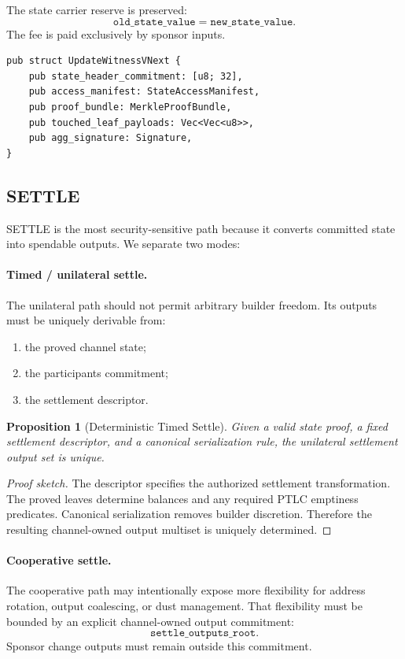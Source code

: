 \documentclass[11pt,a4paper]{article}
\newtheorem{proposition}[theorem]{Proposition}
\begin{document}
The state carrier reserve is preserved:
\[
\texttt{old\_state\_value} = \texttt{new\_state\_value}.
\]
The fee is paid exclusively by sponsor inputs.

\begin{lstlisting}[caption={Proof-First UPDATE Witness Sketch}, float=!htb]
pub struct UpdateWitnessVNext {
    pub state_header_commitment: [u8; 32],
    pub access_manifest: StateAccessManifest,
    pub proof_bundle: MerkleProofBundle,
    pub touched_leaf_payloads: Vec<Vec<u8>>,
    pub agg_signature: Signature,
}
\end{lstlisting}

\subsection{SETTLE}

SETTLE is the most security-sensitive path because it converts committed state into spendable outputs. We separate two modes:

\paragraph{Timed / unilateral settle.}
The unilateral path should not permit arbitrary builder freedom. Its outputs must be uniquely derivable from:
\begin{enumerate}
    \item the proved channel state;
    \item the participants commitment;
    \item the settlement descriptor.
\end{enumerate}

\begin{proposition}[Deterministic Timed Settle]
Given a valid state proof, a fixed settlement descriptor, and a canonical serialization rule, the unilateral settlement output set is unique.
\end{proposition}

\begin{proof}[Proof sketch]
The descriptor specifies the authorized settlement transformation. The proved leaves determine balances and any required PTLC emptiness predicates. Canonical serialization removes builder discretion. Therefore the resulting channel-owned output multiset is uniquely determined.
\end{proof}

\paragraph{Cooperative settle.}
The cooperative path may intentionally expose more flexibility for address rotation, output coalescing, or dust management. That flexibility must be bounded by an explicit channel-owned output commitment:
\[
\texttt{settle\_outputs\_root}.
\]
Sponsor change outputs must remain outside this commitment.
\end{document}
